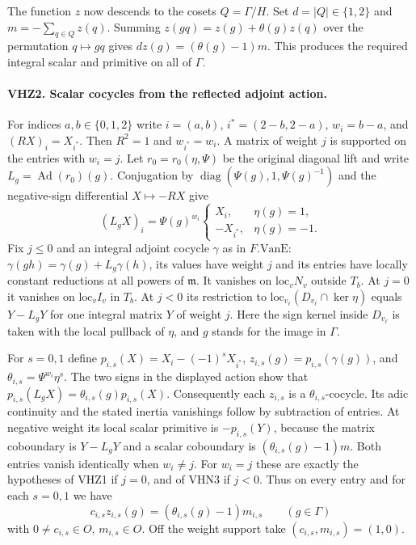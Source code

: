 The function $z$ now descends to the cosets $Q=\Gamma/H$.
Set $d=|Q|\in\{1,2\}$ and $m=-\sum_{q\in Q}z(q)$. Summing
$z(gq)=z(g)+\theta(g)z(q)$ over the permutation $q\mapsto gq$
gives $d z(g)=(\theta(g)-1)m$. This produces the required
integral scalar and primitive on all of $\Gamma$.

\paragraph{VHZ2. Scalar cocycles from the reflected adjoint action.}
\label{claim:VHZ2}
For indices $a,b\in\{0,1,2\}$ write $i=(a,b)$,
$i^*=(2-b,2-a)$, $w_i=b-a$, and $(R X)_i=X_{i^*}$.
Then $R^2=1$ and $w_{i^*}=w_i$. A matrix of weight $j$ is
supported on the entries with $w_i=j$. Let $r_0=r_0(\eta,\Psi)$
be the original diagonal lift and write $L_g=\operatorname{Ad}(r_0)(g)$.
Conjugation by $\operatorname{diag}(\Psi(g),1,\Psi(g)^{-1})$
and the negative-sign differential $X\mapsto-RX$ give
\[
 (L_gX)_i=\Psi(g)^{w_i}
 \begin{cases}X_i,&\eta(g)=1,\\-X_{i^*},&\eta(g)=-1.\end{cases}
\]
Fix $j\le0$ and an integral adjoint cocycle $\gamma$ as in
$F.\mathrm{VanE}$: $\gamma(gh)=\gamma(g)+L_g\gamma(h)$,
its values have weight $j$ and its entries have locally constant
reductions at all powers of $\mathfrak m$. It vanishes on
$\mathrm{loc}_v N_v$ outside $T_b$. At $j=0$ it vanishes on
$\mathrm{loc}_v I_v$ in $T_b$. At $j<0$ its restriction to
$\mathrm{loc}_{v_\ell}(D_{v_\ell}\cap\ker\eta)$ equals
$Y-L_gY$ for one integral matrix $Y$ of weight $j$.
Here the sign kernel inside $D_{v_\ell}$ is taken with the local
pullback of $\eta$, and $g$ stands for the image in $\Gamma$.

For $s=0,1$ define $p_{i,s}(X)=X_i-(-1)^sX_{i^*}$,
$z_{i,s}(g)=p_{i,s}(\gamma(g))$, and
$\theta_{i,s}=\Psi^{w_i}\eta^s$. The two signs in the displayed
action show that $p_{i,s}(L_gX)=\theta_{i,s}(g)p_{i,s}(X)$.
Consequently each $z_{i,s}$ is a $\theta_{i,s}$-cocycle. Its
adic continuity and the stated inertia vanishings follow by
subtraction of entries. At negative weight its local scalar
primitive is $-p_{i,s}(Y)$, because the matrix coboundary
is $Y-L_gY$ and a scalar coboundary is $(\theta_{i,s}(g)-1)m$.
Both entries vanish identically when $w_i\ne j$. For $w_i=j$ these
are exactly the hypotheses of VHZ1 if $j=0$, and of VHN3 if $j<0$.
Thus on every entry and for each $s=0,1$ we have
\[
  c_{i,s}z_{i,s}(g)=(\theta_{i,s}(g)-1)m_{i,s}\qquad(g\in\Gamma)
\]
with $0\ne c_{i,s}\in O$, $m_{i,s}\in O$. Off the weight support
take $(c_{i,s},m_{i,s})=(1,0)$.

